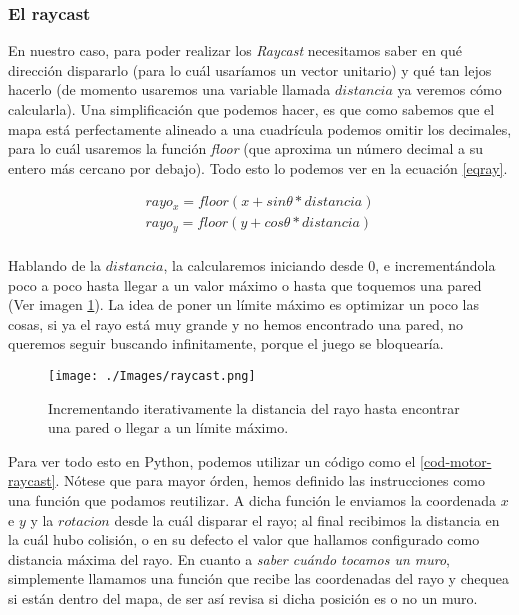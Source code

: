 \subsubsection{El raycast}

En nuestro caso, para poder realizar los \emph{Raycast} necesitamos saber en qué dirección dispararlo (para lo cuál usaríamos un vector unitario) y qué tan lejos hacerlo (de momento usaremos una variable llamada $distancia$ ya veremos cómo calcularla). Una simplificación que podemos hacer, es que como sabemos que el mapa está perfectamente alineado a una cuadrícula podemos omitir los decimales, para lo cuál usaremos la función \emph{floor} (que aproxima un número decimal a su entero más cercano por debajo). Todo esto lo podemos ver en la ecuación \ref{eqray}.

\begin{equation}
\begin{aligned}
\label{eqray}
rayo_x = floor(x + sin \theta * distancia)\\
rayo_y = floor(y + cos \theta * distancia)\\
\end{aligned}
\end{equation}

Hablando de la $distancia$, la calcularemos iniciando desde 0, e incrementándola poco a poco hasta llegar a un valor máximo o hasta que toquemos una pared (Ver imagen \ref{raycastit}). La idea de poner un límite máximo es optimizar un poco las cosas, si ya el rayo está muy grande y no hemos encontrado una pared, no queremos seguir buscando infinitamente, porque el juego se bloquearía.

\begin{figure}[h!]
	\centering
	\texttt{[image: ./Images/raycast.png]}
	\caption{Incrementando iterativamente la distancia del rayo hasta encontrar una pared o llegar a un límite máximo.}
	\label{raycastit}
\end{figure}

Para ver todo esto en Python, podemos utilizar un código como el \ref{cod-motor-raycast}. Nótese que para mayor órden, hemos definido las instrucciones como una función que podamos reutilizar. A dicha función le enviamos la coordenada $x$ e $y$ y la $rotacion$ desde la cuál disparar el rayo; al final recibimos la distancia en la cuál hubo colisión, o en su defecto el valor que hallamos configurado como distancia máxima del rayo. En cuanto a \emph{saber cuándo tocamos un muro}, simplemente llamamos una función que recibe las coordenadas del rayo y chequea si están dentro del mapa, de ser así revisa si dicha posición es o no un muro.

